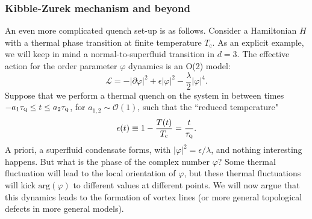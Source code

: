 \documentclass[10pt, oneside]{book}
\begin{document}
\begin{doublespace}
\subsubsection{Kibble-Zurek mechanism and beyond}
An even more complicated quench set-up is as follows.    Consider a Hamiltonian $H$ with a thermal phase transition at finite temperature $T_{\mathrm{c}}$.   As an explicit example, we will keep in mind a normal-to-superfluid transition in $d=3$.   The effective action for the order parameter $\varphi$ dynamics is an O(2) model: \begin{equation}
\mathcal{L} = -|\partial \varphi|^2 + \epsilon |\varphi|^2 - \frac{\lambda}{2}|\varphi|^4.  \label{eq:kzml}
\end{equation}    
Suppose that we perform a thermal quench on the system in between times $-a_1\tau_{\textsc{q}} \le t \le a_2\tau_{\textsc{q}}$, for $a_{1,2}\sim \mathcal{O}(1)$, such that the ``reduced temperature" \begin{equation}
\epsilon(t) \equiv 1-\frac{T(t)}{T_{\mathrm{c}}} = \frac{t}{\tau_{\textsc{q}}}.
\end{equation}
A priori, a superfluid condensate forms, with $|\varphi|^2 = \epsilon/\lambda$, and nothing interesting happens.  But what is the phase of the complex number $\varphi$?    Some thermal fluctuation will lead to the local orientation of $\varphi$,  but these thermal fluctuations will kick $\mathrm{arg}(\varphi)$ to different values at different points.   We will now argue that this dynamics leads to the formation of vortex lines (or more general topological defects in more general models).


\end{doublespace}
\end{document}
